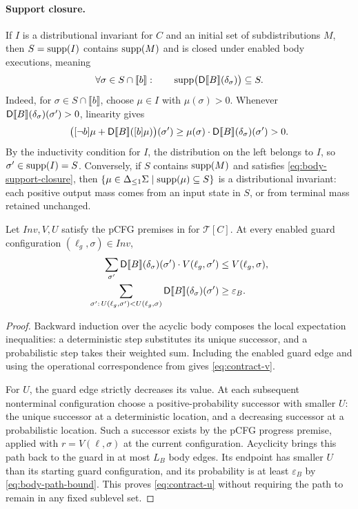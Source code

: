 \paragraph{Support closure.}
If $I$ is a distributional invariant for $C$ and an initial set of
subdistributions $M$, then $S=\textnormal{supp}(I)$ contains $\textnormal{supp}(M)$ and is closed
under enabled body executions, meaning
\begin{equation}
 \forall\sigma\in S\cap\llbracket b\rrbracket:\qquad
 \textnormal{supp}\bigl(\mathsf{D}\llbracket B\rrbracket(\delta_{\sigma})\bigr)\subseteq S.
 \label{eq:body-support-closure}
\end{equation}
Indeed, for
$\sigma\in S\cap\llbracket b\rrbracket$, choose $\mu\in I$ with
$\mu(\sigma)>0$. Whenever $\mathsf{D}\llbracket B\rrbracket(\delta_{\sigma})(\sigma')>0$,
linearity gives
\[
 \bigl([\neg b]\mu+\mathsf{D}\llbracket B\rrbracket([b]\mu)\bigr)(\sigma')
 \geq\mu(\sigma)\cdot\mathsf{D}\llbracket B\rrbracket(\delta_{\sigma})(\sigma')>0.
\]
By the inductivity condition for $I$, the distribution on the left
belongs to $I$, so $\sigma'\in\textnormal{supp}(I)=S$.
Conversely, if $S$ contains $\textnormal{supp}(M)$ and satisfies
\eqref{eq:body-support-closure},
then $\{\mu\in{\Delta_{\leq 1}\Sigma}\mid\textnormal{supp}(\mu)\subseteq S\}$ is a
distributional invariant: each positive output mass comes from an input
state in $S$, or from terminal mass retained unchanged.

\begin{lemma}
\label{lem:contract-v}
\label{lem:contract-u}
Let $\mathit{Inv},V,U$ satisfy the pCFG premises in
 for $\mathcal T[C]$. At every enabled guard
configuration $(\ell_g,\sigma)\in\mathit{Inv}$,
\begin{align}
 \sum_{\sigma'}\mathsf{D}\llbracket B\rrbracket(\delta_{\sigma})(\sigma')
                \cdot V(\ell_g,\sigma')&\leq V(\ell_g,\sigma),
 \label{eq:contract-v}\\
 \sum_{\sigma':\,U(\ell_g,\sigma')<U(\ell_g,\sigma)}
       \mathsf{D}\llbracket B\rrbracket(\delta_{\sigma})(\sigma')&\geq\varepsilon_B.
 \label{eq:contract-u}
\end{align}
\end{lemma}
\begin{proof}
Backward induction over the acyclic body composes the local expectation
inequalities: a deterministic step substitutes its unique successor,
and a probabilistic step takes their weighted sum. Including the enabled
guard edge and using the operational correspondence from
 gives \eqref{eq:contract-v}.

For $U$, the guard edge strictly decreases its value. At each subsequent
nonterminal configuration choose a positive-probability successor with
smaller $U$: the unique successor at a deterministic location, and a
decreasing successor at a probabilistic location. Such a successor exists
by the pCFG progress premise, applied with $r=V(\ell,\sigma)$ at the
current configuration. Acyclicity brings this path back to the guard in
at most $L_B$ body edges. Its endpoint has smaller $U$ than its starting
guard configuration, and its probability is at least $\varepsilon_B$
by \eqref{eq:body-path-bound}. This proves \eqref{eq:contract-u} without
requiring the path to remain in any fixed sublevel set.
\end{proof}

